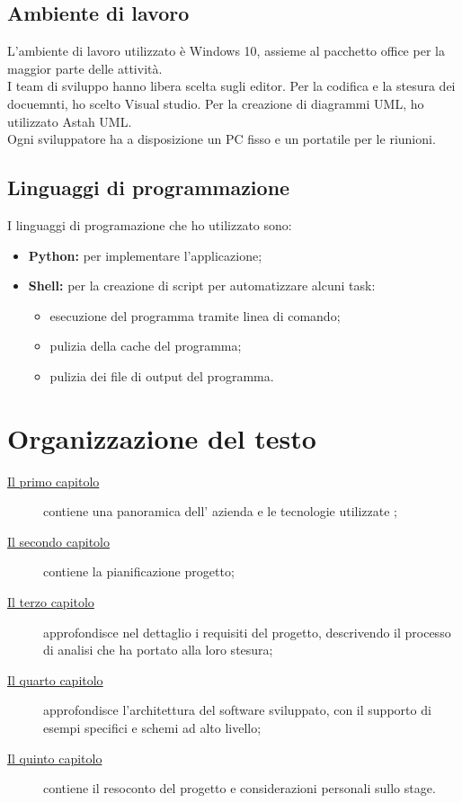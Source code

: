 \subsection{Ambiente di lavoro}
L'ambiente di lavoro utilizzato è Windows 10, assieme al pacchetto office per la maggior parte delle attività.\\
I team di sviluppo hanno libera scelta sugli editor. Per la codifica e la stesura dei docuemnti, ho scelto Visual studio. Per la creazione di diagrammi UML, ho utilizzato Astah UML.\\
Ogni sviluppatore ha a disposizione un PC fisso e un portatile per le riunioni.

\subsection{Linguaggi di programmazione}
I linguaggi di programazione che ho utilizzato sono:
\begin{itemize}
    \item \textbf{Python:} per implementare l'applicazione;
    \item \textbf{Shell:} per la creazione di script per automatizzare alcuni task:
    \begin{itemize}
        \item esecuzione del programma tramite linea di comando;
        \item pulizia della cache del programma;
        \item pulizia dei file di output del programma.
    \end{itemize}
\end{itemize}

\section{Organizzazione del testo}

\begin{description}
    \item[{\hyperref[cap:introduzione]{Il primo capitolo}}] contiene una panoramica dell' azienda e le tecnologie utilizzate \company{};

    \item[{\hyperref[cap:descrizione-stage]{Il secondo capitolo}}] contiene la pianificazione progetto; 
    
    \item[{\hyperref[cap:analisi-requisiti]{Il terzo capitolo}}] approfondisce nel dettaglio i requisiti del progetto, descrivendo il processo di analisi che ha portato alla loro stesura;
    
    \item[{\hyperref[cap:progettazione-codifica]{Il quarto capitolo}}] approfondisce l'architettura del software sviluppato, con il supporto di esempi specifici e schemi ad alto livello;
        
    \item[{\hyperref[cap:conclusioni]{Il quinto capitolo}}] contiene il resoconto del progetto e considerazioni personali sullo stage. 
\end{description}